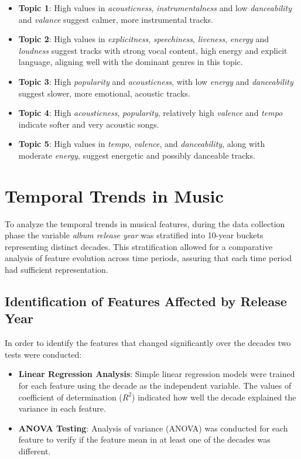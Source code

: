 \begin{itemize}
  \item \textbf{Topic 1}: High values in \textit{acousticness},
    \textit{instrumentalness} and low \textit{danceability} and
    \textit{valance} suggest calmer, more instrumental tracks.
  \item \textbf{Topic 2}: High values in \textit{explicitness},
    \textit{speechiness}, \textit{liveness}, \textit{energy} and
    \textit{loudness} suggest tracks with strong vocal content, high energy
    and explicit language, aligning well with the dominant genres in this
    topic.
  \item \textbf{Topic 3}: High \textit{popularity} and \textit{acousticness},
    with low \textit{energy} and  \textit{danceability} suggest slower,
    more emotional, acoustic tracks.
  \item \textbf{Topic 4}: High \textit{acousticness},  \textit{popularity},
    relatively high \textit{valence} and \textit{tempo} indicate softer and
    very acoustic songs.
  \item \textbf{Topic 5}: High values in \textit{tempo}, \textit{valence}, and
    \textit{danceability}, along with moderate \textit{energy}, suggest
    energetic and possibly danceable tracks.
\end{itemize}


\section{Temporal Trends in Music}
\label{sec:temporaltrends}

To analyze the temporal trends in musical features, during the data collection
phase the variable \textit{album release year} was stratified into 10-year
buckets representing distinct decades. This stratification allowed for a
comparative analysis of feature evolution across time periods, assuring
that each time period had sufficient representation.


\subsection{Identification of Features Affected by Release Year}

In order to identify the features that changed significantly over the decades
two tests were conducted:


\begin{itemize}
  \item \textbf{Linear Regression Analysis}: Simple linear regression models
    were trained for each feature using the decade as the independent variable.
    The values of coefficient of determination ($R^2$) indicated how well the
    decade explained the variance in each feature.
  \item \textbf{ANOVA Testing}: Analysis of variance (ANOVA) was conducted for
    each feature to verify if the feature mean in at least one of the decades
    was different.
\end{itemize}

